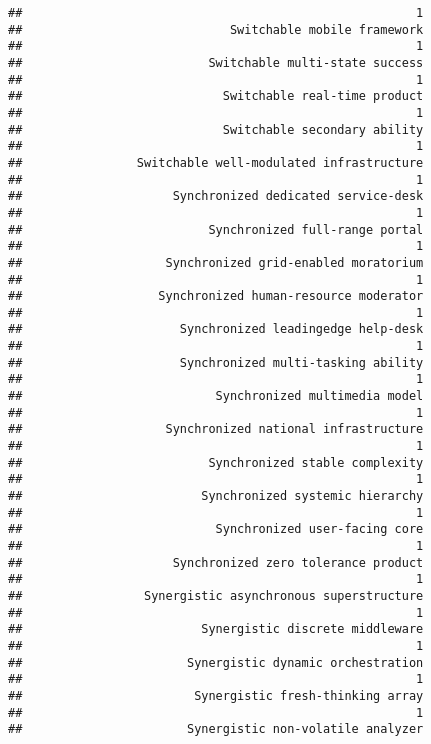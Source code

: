 \documentclass[
]{article}
\begin{document}
\begin{verbatim}
##                                                       1 
##                             Switchable mobile framework 
##                                                       1 
##                          Switchable multi-state success 
##                                                       1 
##                            Switchable real-time product 
##                                                       1 
##                            Switchable secondary ability 
##                                                       1 
##                Switchable well-modulated infrastructure 
##                                                       1 
##                     Synchronized dedicated service-desk 
##                                                       1 
##                          Synchronized full-range portal 
##                                                       1 
##                    Synchronized grid-enabled moratorium 
##                                                       1 
##                   Synchronized human-resource moderator 
##                                                       1 
##                      Synchronized leadingedge help-desk 
##                                                       1 
##                      Synchronized multi-tasking ability 
##                                                       1 
##                           Synchronized multimedia model 
##                                                       1 
##                    Synchronized national infrastructure 
##                                                       1 
##                          Synchronized stable complexity 
##                                                       1 
##                         Synchronized systemic hierarchy 
##                                                       1 
##                           Synchronized user-facing core 
##                                                       1 
##                     Synchronized zero tolerance product 
##                                                       1 
##                 Synergistic asynchronous superstructure 
##                                                       1 
##                         Synergistic discrete middleware 
##                                                       1 
##                       Synergistic dynamic orchestration 
##                                                       1 
##                        Synergistic fresh-thinking array 
##                                                       1 
##                       Synergistic non-volatile analyzer 

\end{verbatim}
\end{document}
